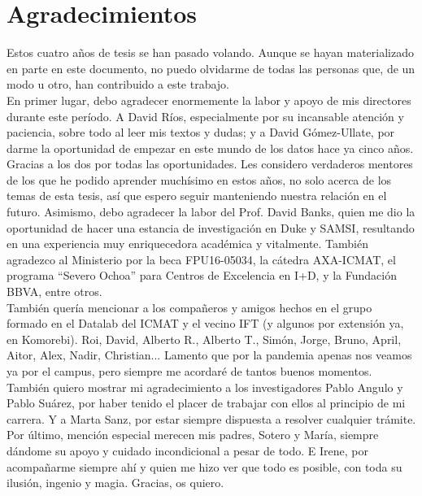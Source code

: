 \documentclass[a4paper, 11pt, openright, twoside]{reportPhD}
\numberwithin{figure}{chapter}
\numberwithin{table}{chapter}
\numberwithin{equation}{chapter}
\begin{document}

\chapter*{Agradecimientos}

Estos cuatro años de tesis se han pasado volando. Aunque se hayan materializado en parte en este documento, no puedo olvidarme de todas las personas que, de un modo u otro, han contribuido a este trabajo. \\

En primer lugar, debo agradecer enormemente la labor y apoyo de mis directores durante este período. A David Ríos, especialmente por su incansable atención y paciencia, sobre todo al leer mis textos y dudas; y a David Gómez-Ullate, por darme la oportunidad de empezar en este mundo de los datos hace ya cinco años. Gracias a los dos por todas las oportunidades. Les considero verdaderos mentores de los que he podido aprender muchísimo en estos años, no solo acerca de los temas de esta tesis, así que espero seguir manteniendo nuestra relación en el futuro. 
Asimismo, debo agradecer la labor del Prof. David Banks, quien me dio la oportunidad de hacer una estancia de investigación en Duke y SAMSI, resultando en una experiencia muy enriquecedora académica y vitalmente. También agradezco al Ministerio por la beca FPU16-05034, la cátedra AXA-ICMAT, el programa “Severo Ochoa”
para Centros de Excelencia en I+D, y la Fundación BBVA, entre otros. \\

También quería mencionar a los compañeros y amigos hechos en el grupo formado en el Datalab del ICMAT y el vecino IFT (y algunos por extensión ya, en Komorebi). Roi, David, Alberto R., Alberto T., Simón, Jorge, Bruno, April, Aitor, Alex, Nadir, Christian... 
Lamento que por la pandemia apenas nos veamos ya por el campus, pero siempre me acordaré de tantos buenos momentos. También quiero mostrar mi agradecimiento a los investigadores Pablo Angulo y Pablo Suárez, por haber tenido el placer de trabajar con ellos al principio de mi carrera. Y a Marta Sanz, por estar siempre dispuesta a resolver cualquier trámite. \\

Por último, mención especial merecen mis padres, Sotero y María, siempre dándome su apoyo y cuidado incondicional a pesar de todo. E Irene, por acompañarme siempre ahí y quien me hizo ver que todo es posible, con toda su ilusión, ingenio y magia. Gracias, os quiero.
\end{document}

